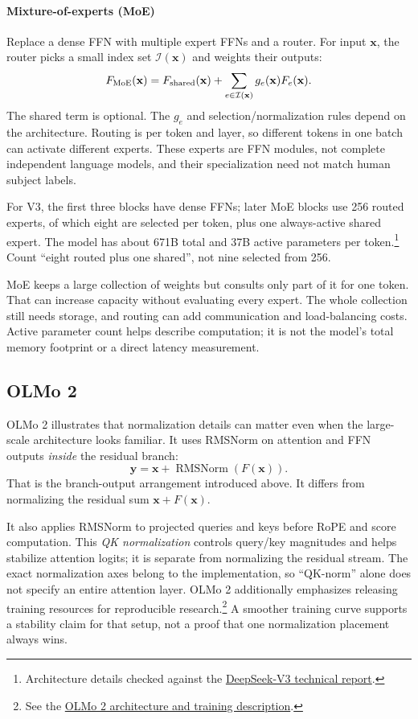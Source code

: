\documentclass[11pt, oneside]{book}
\let\originalsubsection\subsection
\renewcommand{\subsection}{\Needspace{6\baselineskip}\originalsubsection}
\begin{document}
\paragraph{Mixture-of-experts (MoE)} Replace a dense FFN with multiple expert FFNs and a router. For input $\mathbf{x}$, the router picks a small index set $\mathcal{I}(\mathbf{x})$ and weights their outputs:
\[
 F_{\rm MoE}(\mathbf{x})=F_{\rm shared}(\mathbf{x})+
 \sum_{e\in\mathcal{I}(\mathbf{x})}g_e(\mathbf{x})F_e(\mathbf{x}).
\]
The shared term is optional. The $g_e$ and selection/normalization rules depend on the architecture. Routing is per token and layer, so different tokens in one batch can activate different experts. These experts are FFN modules, not complete independent language models, and their specialization need not match human subject labels.

For V3, the first three blocks have dense FFNs; later MoE blocks use 256 routed experts, of which eight are selected per token, plus one always-active shared expert. The model has about 671B total and 37B active parameters per token.\footnote{Architecture details checked against the \href{https://arxiv.org/abs/2412.19437}{DeepSeek-V3 technical report}.} Count ``eight routed plus one shared'', not nine selected from 256.

\begin{intbox}[title={A large library, a small reading list}]
MoE keeps a large collection of weights but consults only part of it for one token. That can increase capacity without evaluating every expert. The whole collection still needs storage, and routing can add communication and load-balancing costs. Active parameter count helps describe computation; it is not the model's total memory footprint or a direct latency measurement.
\end{intbox}

\subsection{OLMo 2}\label{sec:source-5-4-3}
OLMo 2 illustrates that normalization details can matter even when the large-scale architecture looks familiar. It uses RMSNorm on attention and FFN outputs \emph{inside} the residual branch:
\[
 \mathbf{y}=\mathbf{x}+\operatorname{RMSNorm}(F(\mathbf{x})).
\]
That is the branch-output arrangement introduced above. It differs from normalizing the residual sum $\mathbf{x}+F(\mathbf{x})$.

It also applies RMSNorm to projected queries and keys before RoPE and score computation. This \emph{QK normalization} controls query/key magnitudes and helps stabilize attention logits; it is separate from normalizing the residual stream. The exact normalization axes belong to the implementation, so ``QK-norm'' alone does not specify an entire attention layer. OLMo 2 additionally emphasizes releasing training resources for reproducible research.\footnote{See the \href{https://allenai.org/blog/olmo2}{OLMo 2 architecture and training description}.} A smoother training curve supports a stability claim for that setup, not a proof that one normalization placement always wins.
\end{document}
